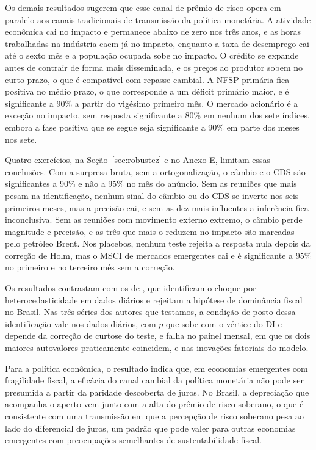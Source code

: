 \documentclass[preprint,authoryear,review,12pt]{elsarticle}
\begin{document}
Os demais resultados sugerem que esse canal de prêmio de risco opera em paralelo aos canais tradicionais de transmissão da política monetária. A atividade econômica cai no impacto e permanece abaixo de zero nos três anos, e as horas trabalhadas na indústria caem já no impacto, enquanto a taxa de desemprego cai até o sexto mês e a população ocupada sobe no impacto. O crédito se expande antes de contrair de forma mais disseminada, e os preços ao produtor sobem no curto prazo, o que é compatível com repasse cambial. A NFSP primária fica positiva no médio prazo, o que corresponde a um déficit primário maior, e é significante a 90\% a partir do vigésimo primeiro mês. O mercado acionário é a exceção no impacto, sem resposta significante a 80\% em nenhum dos sete índices, embora a fase positiva que se segue seja significante a 90\% em parte dos meses nos sete.

Quatro exercícios, na Seção~\ref{sec:robustez} e no Anexo E, limitam essas conclusões. Com a surpresa bruta, sem a ortogonalização, o câmbio e o CDS são significantes a 90\% e não a 95\% no mês do anúncio. Sem as reuniões que mais pesam na identificação, nenhum sinal do câmbio ou do CDS se inverte nos seis primeiros meses, mas a precisão cai, e sem as dez mais influentes a inferência fica inconclusiva. Sem as reuniões com movimento externo extremo, o câmbio perde magnitude e precisão, e as três que mais o reduzem no impacto são marcadas pelo petróleo Brent. Nos placebos, nenhum teste rejeita a resposta nula depois da correção de Holm, mas o MSCI de mercados emergentes cai e é significante a 95\% no primeiro e no terceiro mês sem a correção.

Os resultados contrastam com os de \cite{goncalves2025}, que identificam o choque por heterocedasticidade em dados diários e rejeitam a hipótese de dominância fiscal no Brasil. Nas três séries dos autores que testamos, a condição de posto dessa identificação vale nos dados diários, com $p$ que sobe com o vértice do DI e depende da correção de curtose do teste, e falha no painel mensal, em que os dois maiores autovalores praticamente coincidem, e nas inovações fatoriais do modelo.

Para a política econômica, o resultado indica que, em economias emergentes com fragilidade fiscal, a eficácia do canal cambial da política monetária não pode ser presumida a partir da paridade descoberta de juros. No Brasil, a depreciação que acompanha o aperto vem junto com a alta do prêmio de risco soberano, o que é consistente com uma transmissão em que a percepção de risco soberano pesa ao lado do diferencial de juros, um padrão que pode valer para outras economias emergentes com preocupações semelhantes de sustentabilidade fiscal.
\end{document}
